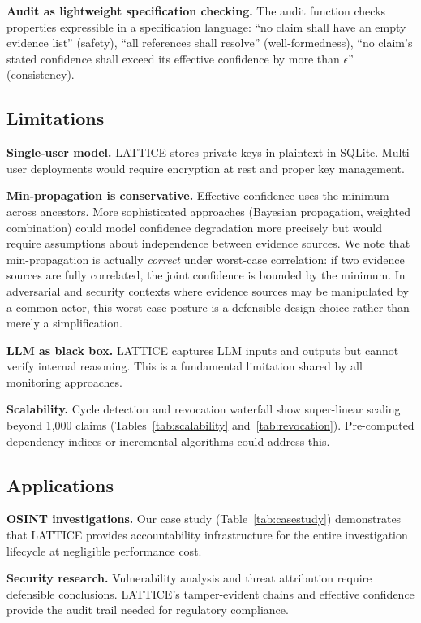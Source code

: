 \documentclass[11pt,twocolumn]{article}
\begin{document}
\textbf{Audit as lightweight specification checking.} The audit function checks properties expressible in a specification language: ``no claim shall have an empty evidence list'' (safety), ``all references shall resolve'' (well-formedness), ``no claim's stated confidence shall exceed its effective confidence by more than $\epsilon$'' (consistency).

\subsection{Limitations}

\textbf{Single-user model.} LATTICE stores private keys in plaintext in SQLite. Multi-user deployments would require encryption at rest and proper key management.

\textbf{Min-propagation is conservative.} Effective confidence uses the minimum across ancestors. More sophisticated approaches (Bayesian propagation, weighted combination) could model confidence degradation more precisely but would require assumptions about independence between evidence sources. We note that min-propagation is actually \textit{correct} under worst-case correlation: if two evidence sources are fully correlated, the joint confidence is bounded by the minimum. In adversarial and security contexts where evidence sources may be manipulated by a common actor, this worst-case posture is a defensible design choice rather than merely a simplification.

\textbf{LLM as black box.} LATTICE captures LLM inputs and outputs but cannot verify internal reasoning. This is a fundamental limitation shared by all monitoring approaches.

\textbf{Scalability.} Cycle detection and revocation waterfall show super-linear scaling beyond 1{,}000 claims (Tables~\ref{tab:scalability} and~\ref{tab:revocation}). Pre-computed dependency indices or incremental algorithms could address this.

\subsection{Applications}

\textbf{OSINT investigations.} Our case study (Table~\ref{tab:casestudy}) demonstrates that LATTICE provides accountability infrastructure for the entire investigation lifecycle at negligible performance cost.

\textbf{Security research.} Vulnerability analysis and threat attribution require defensible conclusions. LATTICE's tamper-evident chains and effective confidence provide the audit trail needed for regulatory compliance.
\end{document}
